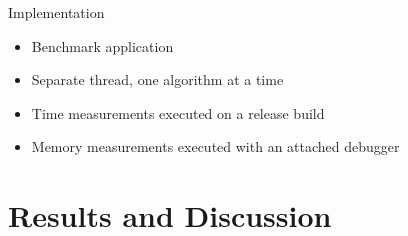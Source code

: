 \documentclass[xcolor={table}]{beamer}
\begin{document}
\begin{frame}{Implementation}
    \begin{itemize}
        \item Benchmark application
        \item Separate thread, one algorithm at a time
        \item Time measurements executed on a release build
        \item Memory measurements executed with an attached debugger
    \end{itemize}
\end{frame}

\section{Results and Discussion}
\end{document}
